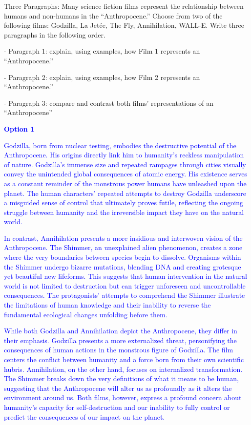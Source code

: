 \documentclass[11pt,fleqn]{book} %
\begin{document}
\begin{exercise}
    Three Paragraphs: Many science fiction films represent the relationship between humans and non-humans in the “Anthropocene.” Choose from two of the following films: Godzilla, La Jetée, The Fly, Annihilation, WALL-E. Write three paragraphs in the following order.

- Paragraph 1: explain, using examples, how Film 1 represents an “Anthropocene.”

- Paragraph 2: explain, using examples, how Film 2 represents an “Anthropocene.”

- Paragraph 3: compare and contrast both films’ representations of an “Anthropocene”

\textcolor{blue}{
\textbf{Option 1}
}

\textcolor{blue}{
Godzilla, born from nuclear testing, embodies the destructive potential of the Anthropocene. His origins directly link  him to humanity's reckless manipulation of nature. Godzilla's immense size and repeated rampages through cities visually convey the unintended global consequences of atomic energy. His existence serves as a constant reminder of the monstrous power humans have unleashed upon the planet. The human characters' repeated attempts to destroy Godzilla underscore a misguided sense of control that ultimately proves futile, reflecting the ongoing struggle between humanity and the irreversible impact they have on the natural world.
}

\textcolor{blue}{
In contrast, Annihilation presents a more insidious and interwoven vision of the Anthropocene.  The Shimmer, an unexplained alien phenomenon, creates a zone where the very boundaries between species begin to dissolve. Organisms within the Shimmer undergo bizarre mutations, blending DNA and creating grotesque yet beautiful new lifeforms. This suggests that  human intervention in the natural world is not limited to destruction but can trigger unforeseen and uncontrollable consequences. The protagonists' attempts to comprehend the Shimmer illustrate the limitations of human knowledge and their inability to reverse the fundamental ecological changes unfolding before them.
}

\textcolor{blue}{
While both Godzilla and Annihilation depict the Anthropocene, they differ in their emphasis.  Godzilla presents a more externalized threat, personifying the consequences of human actions in the monstrous figure of Godzilla. The film centers the conflict between humanity and  a force born from their own scientific hubris. Annihilation, on the other hand,  focuses on internalized transformation. The Shimmer breaks down the very definitions of what it means to be human, suggesting that the Anthropocene will alter us as profoundly as it alters the environment around us.  Both films, however, express a profound concern about humanity's capacity for self-destruction and our inability to fully control or predict the consequences of our impact on the planet.
}


\end{exercise}
\end{document}
